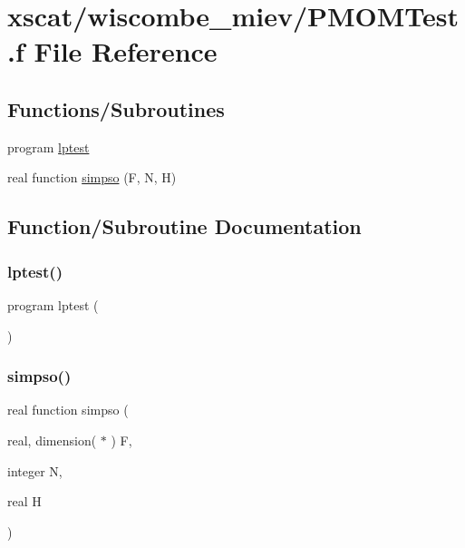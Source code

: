 \hypertarget{_p_m_o_m_test_8f}{}\section{xscat/wiscombe\+\_\+miev/\+P\+M\+O\+M\+Test.f File Reference}
\label{_p_m_o_m_test_8f}
\subsection*{Functions/\+Subroutines}
\begin{DoxyCompactItemize}
\item 
program \hyperlink{_p_m_o_m_test_8f_a90ac95fb0ddc4ae7a9a896ef1387088f}{lptest}
\item 
real function \hyperlink{_p_m_o_m_test_8f_a7e8c03f2662e1a57a52700bcff0b83f2}{simpso} (F, N, H)
\end{DoxyCompactItemize}


\subsection{Function/\+Subroutine Documentation}
\mbox{\label{_p_m_o_m_test_8f_a90ac95fb0ddc4ae7a9a896ef1387088f}} 
\subsubsection{\texorpdfstring{lptest()}{lptest()}}
{\footnotesize\ttfamily program lptest (\begin{DoxyParamCaption}{ }\end{DoxyParamCaption})}

\mbox{\label{_p_m_o_m_test_8f_a7e8c03f2662e1a57a52700bcff0b83f2}} 
\subsubsection{\texorpdfstring{simpso()}{simpso()}}
{\footnotesize\ttfamily real function simpso (\begin{DoxyParamCaption}\item[{real, dimension( $\ast$ )}]{F,  }\item[{integer}]{N,  }\item[{real}]{H }\end{DoxyParamCaption})}


